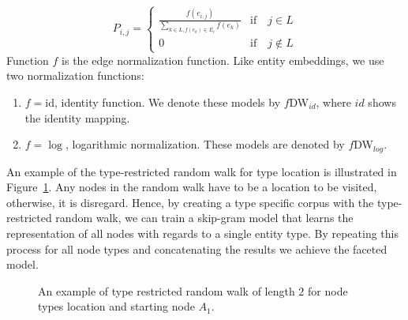 \begin{equation}
P_{ i,j }=\left\{ 
\begin{matrix}
 \frac { f(e_{ i,j }) }{ \sum _{ k\in L,f(e_{ k })\in E_{ i } }^{  }{ f(e_{ k }) }  }  & \mathrm{if}\quad j\in L \\
0 & \mathrm{if}\quad j\notin L
\end{matrix} 
\right. 
\label{eq:transition_type_restricted}
\end{equation} 
\noindent
Function $f$ is the edge normalization function. Like entity embeddings, we use two normalization functions: \\
\begin{enumerate}
\item  $f=\mathrm{id}$, identity function. We denote these models by $f$DW$_{id}$, where $id$ shows the identity mapping. \\
\item  $f=\log$, logarithmic normalization. These models are denoted by  $f$DW$_{log}$.\\
\end{enumerate}
\noindent
An example of the type-restricted random walk for type location is illustrated in Figure~\ref{fig:facetteddeepwalk}. Any nodes in the random walk have to be a location to be visited, otherwise, it is disregard. Hence, by creating a type specific corpus with the type-restricted random walk, we can train a skip-gram model that learns the representation of all nodes with regards to a single entity type. By repeating this process for all node types and concatenating the results we achieve the faceted model.
\begin{figure}
\centering 
\resizebox{0.60\textwidth}{0.27\textwidth}{      

}
\caption{An example of type restricted random walk of length $2$ for node types location and starting node $A_1$.}
\label{fig:facetteddeepwalk}
\end{figure} 
